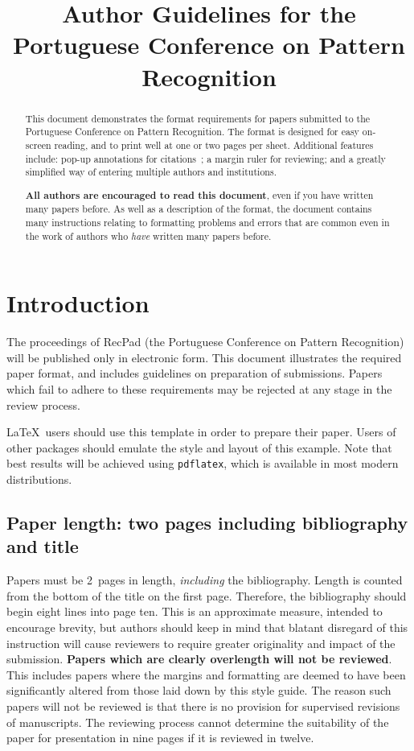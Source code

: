 \documentclass[extendedabs]{recpad2k}
\title{Author Guidelines for the\\ Portuguese Conference on Pattern Recognition}
\begin{document}
\maketitle

\begin{abstract}
This document demonstrates the format requirements for papers submitted
to the Portuguese Conference on Pattern Recognition.  The format is designed for
easy on-screen reading, and to print well at one or two pages per sheet.
Additional features include: pop-up annotations for
citations~\cite{Authors06,Mermin89}; a margin ruler for reviewing; and a
greatly simplified way of entering multiple authors and institutions.

{\bf All authors are encouraged to read this document}, even if you have
written many papers before.  As well as a description of the format, the
document contains many instructions relating to formatting problems and
errors that are common even in the work of authors who {\em have}
written many papers before.
\end{abstract}

\section{Introduction}
\label{sec:intro}
The proceedings of RecPad (the Portuguese Conference on Pattern Recognition) will be published only in electronic form.  This document
illustrates the required paper format, and includes guidelines on
preparation of submissions.  Papers which fail to adhere to these
requirements may be rejected at any stage in the review process.

\LaTeX\ users should use this template in order to prepare their paper.
Users of other packages should emulate the style and layout of this
example.  Note that best results will be achieved using {\tt pdflatex},
which is available in most modern distributions.

\subsection{Paper length: two pages including bibliography and title}
Papers must be 2~pages in length, {\em including} the bibliography.  Length
is counted from the bottom of the title on the first page.  Therefore, the
bibliography should begin eight lines into page ten.  This is an
approximate measure, intended to encourage brevity, but authors should keep
in mind that blatant disregard of this instruction will cause reviewers to
require greater originality and impact of the submission.  {\bf Papers which are
clearly overlength will not be reviewed}.  This includes papers where the
margins and formatting are deemed to have been significantly altered from
those laid down by this style guide.  The reason such papers will not be
reviewed is that there is no provision for supervised revisions of
manuscripts.  The reviewing process cannot determine the suitability of the
paper for presentation in nine pages if it is reviewed in twelve.
\end{document}
